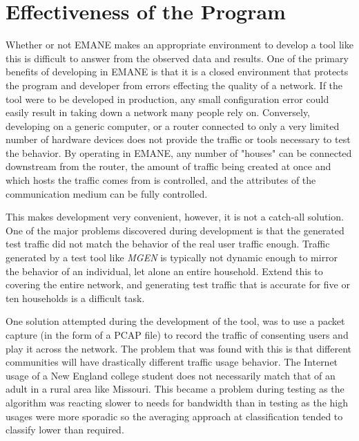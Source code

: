 \section{Effectiveness of the Program}
Whether or not EMANE makes an appropriate environment to develop a tool like this is difficult to answer from the observed data and results.
One of the primary benefits of developing in EMANE is that it is a closed environment that protects the program and developer from errors effecting the quality of a network.
If the tool were to be developed in production, any small configuration error could easily result in taking down a network many people rely on.
Conversely, developing on a generic computer, or a router connected to only a very limited number of hardware devices does not provide the traffic or tools necessary to test the behavior.
By operating in EMANE, any number of "houses" can be connected downstream from the router, the amount of traffic being created at once and which hosts the traffic comes from is controlled, and the attributes of the communication medium can be fully controlled.\par
This makes development very convenient, however, it is not a catch-all solution.
One of the major problems discovered during development is that the generated test traffic did not match the behavior of the real user traffic enough.
Traffic generated by a test tool like \textit{MGEN} is typically not dynamic enough to mirror the behavior of an individual, let alone an entire household.
Extend this to covering the entire network, and generating test traffic that is accurate for five or ten households is a difficult task.\par
One solution attempted during the development of the tool, was to use a packet capture (in the form of a PCAP file) to record the traffic of consenting users and play it across the network.
The problem that was found with this is that different communities will have drastically different traffic usage behavior.
The Internet usage of a New England college student does not necessarily match that of an adult in a rural area like Missouri.
This became a problem during testing as the algorithm was reacting slower to needs for bandwidth than in testing as the high usages were more sporadic so the averaging approach at classification tended to classify lower than required.\par
